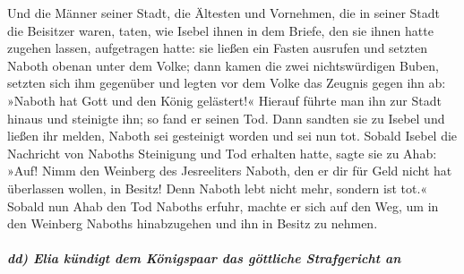 Und die Männer seiner Stadt, die Ältesten und Vornehmen,
die in seiner Stadt die Beisitzer waren, taten, wie Isebel ihnen in dem
Briefe, den sie ihnen hatte zugehen lassen, aufgetragen hatte:
sie ließen ein Fasten ausrufen und setzten Naboth obenan
unter dem Volke; dann kamen die zwei nichtswürdigen
Buben, setzten sich ihm gegenüber und legten vor dem Volke das Zeugnis
gegen ihn ab: »Naboth hat Gott und den König gelästert!« Hierauf führte
man ihn zur Stadt hinaus und steinigte ihn; so fand er seinen Tod.
Dann sandten sie zu Isebel und ließen ihr melden, Naboth
sei gesteinigt worden und sei nun tot. Sobald Isebel die
Nachricht von Naboths Steinigung und Tod erhalten hatte, sagte sie zu
Ahab: »Auf! Nimm den Weinberg des Jesreeliters Naboth, den er dir für
Geld nicht hat überlassen wollen, in Besitz! Denn Naboth lebt nicht
mehr, sondern ist tot.« Sobald nun Ahab den Tod Naboths
erfuhr, machte er sich auf den Weg, um in den Weinberg Naboths
hinabzugehen und ihn in Besitz zu nehmen.

\hypertarget{dd-elia-kuxfcndigt-dem-kuxf6nigspaar-das-guxf6ttliche-strafgericht-an}{%
\subparagraph{dd) Elia kündigt dem Königspaar das göttliche Strafgericht
an}\label{dd-elia-kuxfcndigt-dem-kuxf6nigspaar-das-guxf6ttliche-strafgericht-an}}

